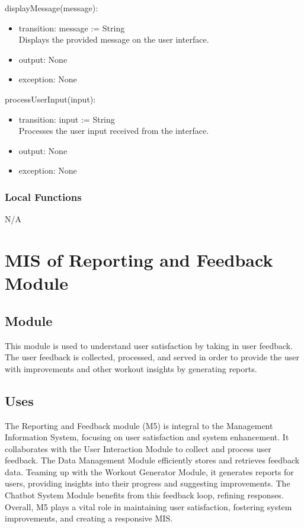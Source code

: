 \documentclass[12pt, titlepage]{article}
\begin{document}
\noindent displayMessage(message):
\begin{itemize}
\item transition: message := String \\
Displays the provided message on the user interface.
\item output:  None
\item exception:  None
\end{itemize}

\noindent processUserInput(input):
\begin{itemize}
\item transition: input := String \\
Processes the user input received from the interface.
\item output:  None
\item exception:  None
\end{itemize}


\subsubsection{Local Functions}
N/A

\section{MIS of Reporting and Feedback Module}

\subsection{Module}
This module is used to understand user satisfaction by taking in user feedback. The user feedback is collected, processed, and served in order to provide the user with improvements and other workout insights by generating reports. 

\subsection{Uses}
The Reporting and Feedback module (M5) is integral to the Management Information System, focusing on user satisfaction and system enhancement. It collaborates with the User Interaction Module to collect and process user feedback. The Data Management Module efficiently stores and retrieves feedback data. Teaming up with the Workout Generator Module, it generates reports for users, providing insights into their progress and suggesting improvements. The Chatbot System Module benefits from this feedback loop, refining responses. Overall, M5 plays a vital role in maintaining user satisfaction, fostering system improvements, and creating a responsive MIS.
\end{document}
